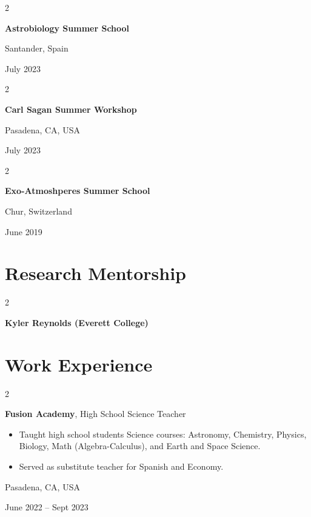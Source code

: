 \documentclass[10pt, letterpaper]{article}
\newenvironment{highlights}{
    \begin{itemize}[
        topsep=0.10 cm,
        parsep=0.10 cm,
        partopsep=0pt,
        itemsep=0pt,
        leftmargin=0.4 cm + 10pt
    ]
}{
    \end{itemize}
} %
\newenvironment{twocolentry}[2][]{
    \onecolentry
    \def\secondColumn{#2}
    \setcolumnwidth{\fill, 4.5 cm}
    \begin{paracol}{2}
}{
    \switchcolumn \raggedleft \secondColumn
    \end{paracol}
    \endonecolentry
} %
\begin{document}
        \vspace{0.2 cm}

        \begin{twocolentry}{
            Santander, Spain

        July 2023
        }
            \textbf{Astrobiology Summer School}
        \end{twocolentry}


        \vspace{0.2 cm}

        \begin{twocolentry}{
            Pasadena, CA, USA

        July 2023
        }
            \textbf{Carl Sagan Summer Workshop}
        \end{twocolentry}


        \vspace{0.2 cm}

        \begin{twocolentry}{
            Chur, Switzerland

        June 2019
        }
            \textbf{Exo-Atmoshperes Summer School}
        \end{twocolentry}



    
    \section{Research Mentorship}



        
        \begin{twocolentry}{
            2024
        }
            \textbf{Kyler Reynolds (Everett College)}
        \end{twocolentry}



    
    \section{Work Experience}



        
        \begin{twocolentry}{
            Pasadena, CA, USA

        June 2022 – Sept 2023
        }
            \textbf{Fusion Academy}, High School Science Teacher
            \begin{highlights}
                \item Taught high school students Science courses: Astronomy, Chemistry, Physics, Biology, Math (Algebra-Calculus), and Earth and Space Science.
                \item Served as substitute teacher for Spanish and Economy.
            \end{highlights}
        \end{twocolentry}
\end{document}
